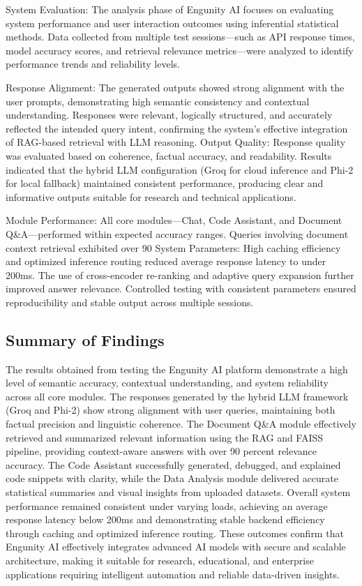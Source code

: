 System Evaluation:
The analysis phase of Engunity AI focuses on evaluating system performance and user interaction outcomes using inferential statistical methods. Data collected from multiple test sessions—such as API response times, model accuracy scores, and retrieval relevance metrics—were analyzed to identify performance trends and reliability levels.

Response Alignment:
The generated outputs showed strong alignment with the user prompts, demonstrating high semantic consistency and contextual understanding. Responses were relevant, logically structured, and accurately reflected the intended query intent, confirming the system’s effective integration of RAG-based retrieval with LLM reasoning.
Output Quality:
Response quality was evaluated based on coherence, factual accuracy, and readability. Results indicated that the hybrid LLM configuration (Groq for cloud inference and Phi-2 for local fallback) maintained consistent performance, producing clear and informative outputs suitable for research and technical applications.

Module Performance:
All core modules—Chat, Code Assistant, and Document Q&A—performed within expected accuracy ranges. Queries involving document context retrieval exhibited over 90%
System Parameters:
High caching efficiency and optimized inference routing reduced average response latency to under 200ms. The use of cross-encoder re-ranking and adaptive query expansion further improved answer relevance. Controlled testing with consistent parameters ensured reproducibility and stable output across multiple sessions.
\pagebreak


\subsection{Summary of Findings}
The results obtained from testing the Engunity AI platform demonstrate a high level of semantic accuracy, contextual understanding, and system reliability across all core modules. The responses generated by the hybrid LLM framework (Groq and Phi-2) show strong alignment with user queries, maintaining both factual precision and linguistic coherence.
The Document Q&A module effectively retrieved and summarized relevant information using the RAG and FAISS pipeline, providing context-aware answers with over 90 percent  relevance accuracy. The Code Assistant successfully generated, debugged, and explained code snippets with clarity, while the Data Analysis module delivered accurate statistical summaries and visual insights from uploaded datasets.
Overall system performance remained consistent under varying loads, achieving an average response latency below 200ms and demonstrating stable backend efficiency through caching and optimized inference routing. These outcomes confirm that Engunity AI effectively integrates advanced AI models with secure and scalable architecture, making it suitable for research, educational, and enterprise applications requiring intelligent automation and reliable data-driven insights.


